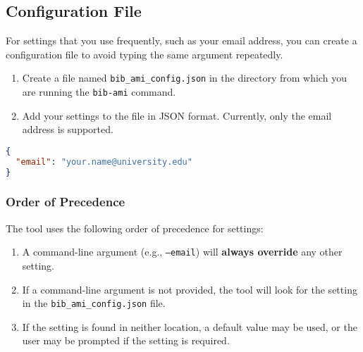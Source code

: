\documentclass[11pt, a4paper]{article}
\begin{document}
\subsection{Configuration File}

For settings that you use frequently, such as your email address, you can create a configuration file to avoid typing the same argument repeatedly.

\begin{enumerate}[leftmargin=*]
    \item Create a file named \texttt{bib\_ami\_config.json} in the directory from which you are running the \texttt{bib-ami} command.
    \item Add your settings to the file in JSON format. Currently, only the email address is supported.
\end{enumerate}

\begin{lstlisting}[language=json, caption={Example bib\_ami\_config.json file}]
{
  "email": "your.name@university.edu"
}
\end{lstlisting}

\subsubsection{Order of Precedence}
The tool uses the following order of precedence for settings:
\begin{enumerate}
    \item A command-line argument (e.g., \texttt{--email}) will \textbf{always override} any other setting.
    \item If a command-line argument is not provided, the tool will look for the setting in the \texttt{bib\_ami\_config.json} file.
    \item If the setting is found in neither location, a default value may be used, or the user may be prompted if the setting is required.
\end{enumerate}
\end{document}
